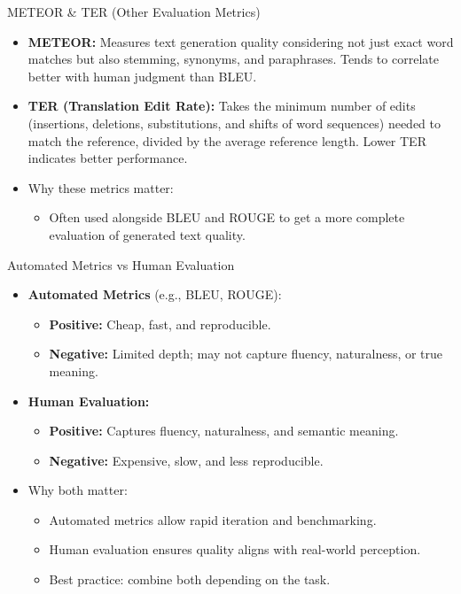 \begin{frame}[allowframebreaks]{METEOR \& TER (Other Evaluation Metrics)}

\begin{itemize}
    \item \textbf{METEOR:}
    Measures text generation quality considering not just exact word matches but also stemming, synonyms, and paraphrases.
    Tends to correlate better with human judgment than BLEU.

    \item \textbf{TER (Translation Edit Rate):}
    Takes the minimum number of edits (insertions, deletions, substitutions, and shifts of word sequences) needed to match the reference, divided by the average reference length.
    Lower TER indicates better performance.

    \item Why these metrics matter:
    \begin{itemize}
        \item Often used alongside BLEU and ROUGE to get a more complete evaluation of generated text quality.
    \end{itemize}
\end{itemize}

\end{frame}


\begin{frame}[allowframebreaks]{Automated Metrics vs Human Evaluation}

\begin{itemize}
    \item \textbf{Automated Metrics} (e.g., BLEU, ROUGE):
    \begin{itemize}
        \item \textbf{Positive:} Cheap, fast, and reproducible.
        \item \textbf{Negative:} Limited depth; may not capture fluency, naturalness, or true meaning.
    \end{itemize}

    \item \textbf{Human Evaluation:}
    \begin{itemize}
        \item \textbf{Positive:} Captures fluency, naturalness, and semantic meaning.
        \item \textbf{Negative:} Expensive, slow, and less reproducible.
    \end{itemize}

    \item Why both matter:
    \begin{itemize}
        \item Automated metrics allow rapid iteration and benchmarking.
        \item Human evaluation ensures quality aligns with real-world perception.
        \item Best practice: combine both depending on the task.
    \end{itemize}
\end{itemize}

\end{frame}


